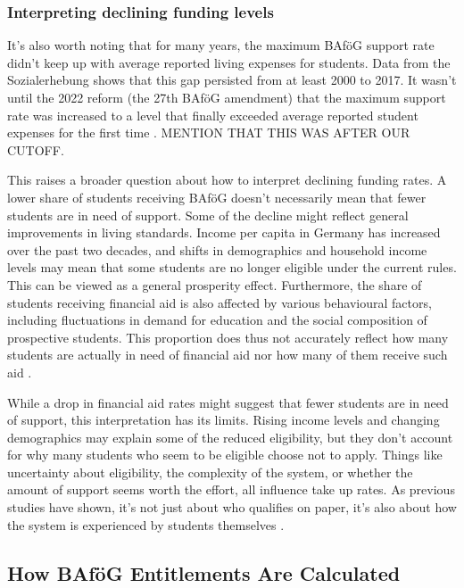 \subsubsection*{Interpreting declining funding levels}
\label{subsection:interpreting-declining-funding-levels}

It’s also worth noting that for many years, the maximum BAföG support rate didn’t keep up with average reported living expenses for students. Data from the Sozialerhebung shows that this gap persisted from at least 2000 to 2017. It wasn’t until the 2022 reform (the 27th BAföG amendment) that the maximum support rate was increased to a level that finally exceeded average reported student expenses for the first time \citep{meier_bafog_2024}. MENTION THAT THIS WAS AFTER OUR CUTOFF.

This raises a broader question about how to interpret declining funding rates. A lower share of students receiving BAföG doesn’t necessarily mean that fewer students are in need of support. Some of the decline might reflect general improvements in living standards. Income per capita in Germany has increased over the past two decades, and shifts in demographics and household income levels may mean that some students are no longer eligible under the current rules. This can be viewed as a general prosperity effect. Furthermore, the share of students receiving financial aid is also affected by various behavioural factors, including fluctuations in demand for education and the social composition of prospective students. This proportion does thus not accurately reflect how many students are actually in need of financial aid nor how many of them receive such aid \citep{meier_bafog_2024}.

While a drop in financial aid rates might suggest that fewer students are in need of support, this interpretation has its limits. Rising income levels and changing demographics may explain some of the reduced eligibility, but they don't account for why many students who seem to be eligible choose not to apply. Things like uncertainty about eligibility, the complexity of the system, or whether the amount of support seems worth the effort, all influence take up rates. As previous studies have shown, it’s not just about who qualifies on paper, it’s also about how the system is experienced by students themselves \citep{meier_bafog_2024}.


\subsection{How BAföG Entitlements Are Calculated}
\label{subsection:how-bafog-entitlement-is-calculated}

